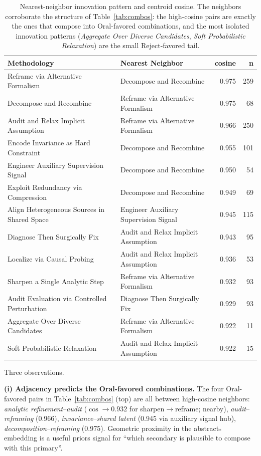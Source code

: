 \documentclass[10pt,a4paper]{article}
\begin{document}
\begin{table}[htbp]
\centering
\caption{Nearest-neighbor innovation pattern and centroid cosine. The neighbors corroborate the structure of Table~\ref{tab:combos}: the high-cosine pairs are exactly the ones that compose into Oral-favored combinations, and the most isolated innovation patterns (\emph{Aggregate Over Diverse Candidates}, \emph{Soft Probabilistic Relaxation}) are the small Reject-favored tail.}
\label{tab:nn}
\small
\begin{tabular}{p{6.0cm} p{6.0cm} r r}
\toprule
\textbf{Methodology} & \textbf{Nearest Neighbor} & \textbf{cosine} & \textbf{n} \\
\midrule
Reframe via Alternative Formalism & Decompose and Recombine & 0.975 & 259 \\
Decompose and Recombine & Reframe via Alternative Formalism & 0.975 & 68 \\
Audit and Relax Implicit Assumption & Reframe via Alternative Formalism & 0.966 & 250 \\
Encode Invariance as Hard Constraint & Decompose and Recombine & 0.955 & 101 \\
Engineer Auxiliary Supervision Signal & Decompose and Recombine & 0.950 & 54 \\
Exploit Redundancy via Compression & Decompose and Recombine & 0.949 & 69 \\
Align Heterogeneous Sources in Shared Space & Engineer Auxiliary Supervision Signal & 0.945 & 115 \\
Diagnose Then Surgically Fix & Audit and Relax Implicit Assumption & 0.943 & 95 \\
Localize via Causal Probing & Audit and Relax Implicit Assumption & 0.936 & 53 \\
Sharpen a Single Analytic Step & Reframe via Alternative Formalism & 0.932 & 93 \\
Audit Evaluation via Controlled Perturbation & Diagnose Then Surgically Fix & 0.929 & 93 \\
Aggregate Over Diverse Candidates & Reframe via Alternative Formalism & 0.922 & 11 \\
Soft Probabilistic Relaxation & Audit and Relax Implicit Assumption & 0.922 & 15 \\
\bottomrule
\end{tabular}
\end{table}

Three observations.

\textbf{(i) Adjacency predicts the Oral-favored combinations.} The four Oral-favored pairs in Table~\ref{tab:combos} (top) are all between high-cosine neighbors: \emph{analytic refinement}--\emph{audit} ($\cos\!\to\!0.932$ for sharpen$\to$reframe; nearby), \emph{audit}--\emph{reframing} (0.966), \emph{invariance}--\emph{shared latent} (0.945 via auxiliary signal hub), \emph{decomposition}--\emph{reframing} (0.975). Geometric proximity in the abstract$_*$ embedding is a useful priors signal for ``which secondary is plausible to compose with this primary''.
\end{document}
